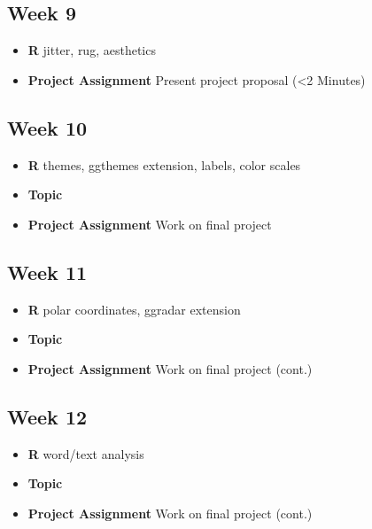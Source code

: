 \documentclass[]{book}
\providecommand{\tightlist}{%
  \setlength{\itemsep}{0pt}\setlength{\parskip}{0pt}}
\begin{document}
\subsection*{Week 9}\label{week-9}

\begin{itemize}
\tightlist
\item
  \textbf{R} jitter, rug, aesthetics
\item
  \textbf{Project Assignment} Present project proposal (\textless{}2
  Minutes)
\end{itemize}

\subsection*{Week 10}\label{week-10}

\begin{itemize}
\tightlist
\item
  \textbf{R} themes, ggthemes extension, labels, color scales
\item
  \textbf{Topic}
\item
  \textbf{Project Assignment} Work on final project
\end{itemize}

\subsection*{Week 11}\label{week-11}

\begin{itemize}
\tightlist
\item
  \textbf{R} polar coordinates, ggradar extension
\item
  \textbf{Topic}
\item
  \textbf{Project Assignment} Work on final project (cont.)
\end{itemize}

\subsection*{Week 12}\label{week-12}

\begin{itemize}
\tightlist
\item
  \textbf{R} word/text analysis
\item
  \textbf{Topic}
\item
  \textbf{Project Assignment} Work on final project (cont.)
\end{itemize}
\end{document}
